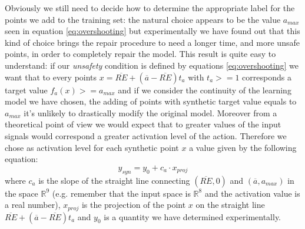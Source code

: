 Obviously we still need to decide how to determine the appropriate label for the points we add to the training set: the natural choice appears to be the value $a_{max}$ seen in equation \ref{eq:overshooting} but experimentally we have found out that this kind of choice brings the repair procedure to need a longer time, and more unsafe points, in order to completely repair the model. This result is quite easy to understand: if our \textit{unsafety} condition is defined by equations \ref{eq:overshooting} we want that to every points $x = \overline{RE} + (\overline{a} - \overline{RE})t_{a}$ with $t_{a} >= 1$ corresponds a target value $f_a(x) >= a_{max}$ and if we consider the continuity of the learning model we have chosen, the adding of points with synthetic target value equals to $a_{max}$ it's unlikely to drastically modify the original model. Moreover from a theoretical point of view we would expect that to greater values of the input signals would correspond a greater activation level of the action. Therefore we chose as activation level for each synthetic point $x$ a value given by the following equation:
\begin{equation}
    y_{syn} = y_0 + c_a \cdot x_{proj}
    \label{eq:output_unsafe}
\end{equation}
where $c_a$ is the slope of the straight line connecting $(\overline{RE}, 0)$ and $(\overline{a}, a_{max})$ in the space $\mathbb{R}^9$ (e.g. remember that the input space is $\mathbb{R}^8$ and the activation value is a real number), $x_{proj}$ is the projection of the point $x$ on the straight line $\overline{RE} + (\overline{a} - \overline{RE})t_{a}$ and $y_0$ is a quantity we have determined experimentally.
